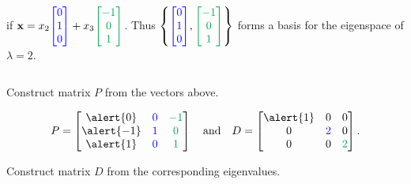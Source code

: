 \documentclass[xcolor=dvipsnames,aspectratio=169,t]{beamer}
\begin{document}
\begin{frame}
\begin{columns}[T]
{  if $\x = x_2 \colorb{\begin{bmatrix} 0 \\ 1 \\ 0\end{bmatrix}}+ x_3 \colorg{\begin{bmatrix} -1 \\ 0 \\ 1\end{bmatrix}}$. Thus $\left\{ \colorb{\begin{bmatrix} 0 \\ 1 \\ 0\end{bmatrix}},  \colorg{\begin{bmatrix} -1 \\ 0 \\ 1\end{bmatrix}} \right\}$ forms a basis for the eigenspace of $\lambda = 2$.}

  \end{columns}
  \medskip

  \pause
  \bb
  \addtocounter{enumi}{2}
  \ii \alert{Construct matrix $P$ from the vectors above.}

  \[ P = \begin{bmatrix} \alert{0} & \colorb{0} & \colorg{-1} \\ 
  \alert{-1} & \colorb{1} & \colorg{0} \\ 
  \alert{1} & \colorb{0} & \colorg{1} \end{bmatrix} \quad \mbox{and} \quad D = \begin{bmatrix} \alert{1} & 0 & 0 \\ 0 & \colorb{2} & 0 \\ 0 & 0 & \colorg{2} \end{bmatrix} .\]

  \ii \alert{Construct matrix $D$ from the corresponding eigenvalues.}
  \ee
\end{frame}
\end{document}
